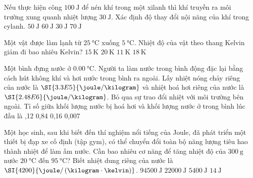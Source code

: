 \begin{ex}
	Nếu thực hiện công $\SI{100}{\joule}$ để nén khí trong một xilanh thì khí truyền ra môi trường xung quanh nhiệt lượng $\SI{30}{\joule}$. Xác định độ thay đổi nội năng của khí trong cylanh.
	\choice
	{$\SI{50}{\joule}$}
	{$\SI{60}{\joule}$}
	{$\SI{30}{\joule}$}
	{\True $\SI{70}{\joule}$}
\end{ex}
\begin{ex}
	Một vật được làm lạnh từ $\SI{25}{\celsius}$ xuống $\SI{5}{\celsius}$. Nhiệt độ của vật theo thang Kelvin giảm đi bao nhiêu Kelvin?
	\choice
	{$\SI{15}{\kelvin}$}
	{\True $\SI{20}{\kelvin}$}
	{$\SI{11}{\kelvin}$}
	{$\SI{18}{\kelvin}$}
\end{ex}
\begin{ex}
Một bình đựng nước ở $\SI{0.00}{\celsius}$. Người ta làm nước trong bình động đặc lại bằng cách hút không khí và hơi nước trong bình ra ngoài. Lấy nhiệt nóng chảy riêng của nước là $\SI{3.3E5}{\joule/\kilogram}$ và nhiệt hoá hơi riêng của nước là $\SI{2.48E6}{\joule/\kilogram}$. Bỏ qua sự trao đổi nhiệt với môi trường bên ngoài. Tỉ số giữa khối lượng nước bị hoá hơi và khối lượng nước ở trong bình lúc đầu là
	\choice
	{,12}
	{0,84}
	{0,16}
	{0,007}
\end{ex}
\begin{ex}
	Một học sinh, sau khi biết đến thí nghiệm nổi tiếng của Joule, đã phát triển một thiết bị đạp xe cố định (tập gym), có thể chuyển đổi toàn bộ năng lượng tiêu hao thành nhiệt để làm ấm nước. Cần bao nhiêu cơ năng để tăng nhiệt độ của $\SI{300}{\gram}$ nước $\SI{20}{\celsius}$ đến $\SI{95}{\celsius}$? Biết nhiệt dung riêng của nước là $\SI{4200}{\joule/\left(\kilogram\cdot\kelvin\right)}$.
	\choice
	{\True $\SI{94500}{\joule}$}
	{$\SI{22000}{\joule}$}
	{$\SI{5400}{\joule}$}
	{$\SI{14}{\joule}$}
\end{ex}

